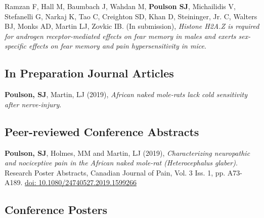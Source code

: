 \documentclass[letterpaper]{article}
\renewenvironment{itemize}{
  \begin{list}{}{
    \setlength{\leftmargin}{1.5em}
  }
}{
  \end{list}
}
\begin{document}
\begin{itemize}

\item Ramzan F, Hall M, Baumbach J, Wahdan M, \textbf {Poulson SJ}, Michailidis V, Stefanelli G, Narkaj K, Tao C, Creighton SD, Khan D, Steininger, Jr. C, Walters BJ, Monks AD, Martin LJ, Zovkic IB. (In submission),
\textit{Histone H2A.Z is required for androgen receptor-mediated effects on fear memory in males and exerts sex-specific effects on fear memory and pain hypersensitivity in mice}.
\end{itemize}

\subsection*{In Preparation Journal Articles}

\begin{itemize}

\item \textbf {Poulson, SJ}, Martin, LJ (2019),
\textit{African naked mole-rats lack cold sensitivity after nerve-injury}.
\end{itemize}

\subsection*{Peer-reviewed Conference Abstracts}

\begin{itemize}
\item \textbf {Poulson, SJ}, Holmes, MM and Martin, LJ (2019), 
\textit{Characterizing neuropathic and nociceptive pain in the African naked mole-rat (Heterocephalus glaber)}. Research Poster Abstracts, Canadian Journal of Pain, Vol. 3 Iss. 1, pp. A73-A189. 
\href{https://doi.org/10.1080/24740527.2019.1599266}{doi: 10.1080/24740527.2019.1599266}
\end{itemize}

\subsection*{Conference Posters}
\end{document}
